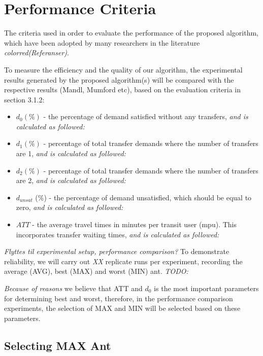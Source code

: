 \section{Performance Criteria}
\label{sec:performanceCriteria}

The criteria used in order to evaluate the performance of the proposed algorithm, which have been adopted by many researchers in the literature \emph{color{red}(Referanser)}.

To measure the efficiency and the quality of our algorithm, the experimental results generated by the proposed algorithm(s) will be compared with the respective results (Mandl, Mumford etc), based on the evaluation criteria in section 3.1.2: 

\begin{itemize}
\item $d_0 (\%)$ - the percentage of demand satisfied without any transfers, \emph{\color{red}and is calculated as followed:}
\item $d_1 (\%)$ - percentage of total transfer demands where the number of transfers are 1, \emph{\color{red}and is calculated as followed:}
\item $d_2 (\%)$ - percentage of total transfer demands where the number of transfers are 2, \emph{\color{red}and is calculated as followed:}
\item $d_{unsat}$ (\%) - the percentage of demand unsatisfied, which should be equal to zero, \emph{\color{red}and is calculated as followed:}
\item $ATT$  - the average travel times in minutes per transit user (mpu). This incorporates transfer waiting times, \emph{\color{red}and is calculated as followed:}
\end{itemize}


\emph{\color{red} Flyttes til experimental setup, performance comparison? }To demonstrate reliability, we will carry out \emph{\color{red} XX } replicate runs per experiment, recording the average (AVG), best (MAX) and worst (MIN) ant.  
\emph{\color{red} TODO:}

\emph{\color{red} Because of reasons }we believe that ATT and $d_0$ is the most important parameters for determining best and worst, therefore, in the performance comparison experiments, the selection of MAX and MIN will be selected based on these parameters.

\subsection{Selecting MAX Ant}

